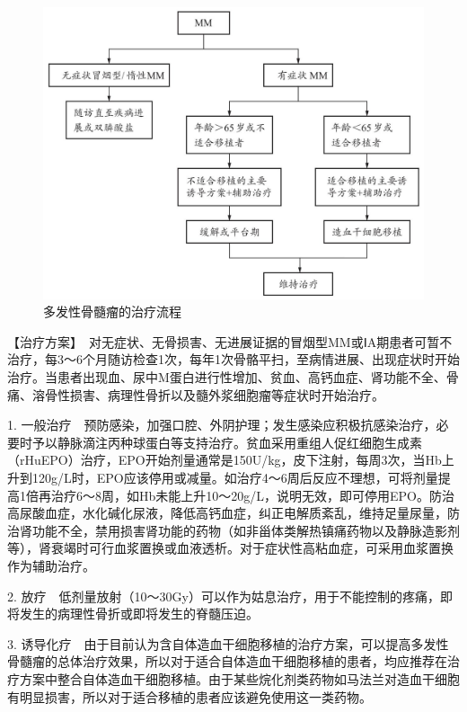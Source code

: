 \begin{figure}[!htbp]
 \centering
 \includegraphics{./images/Image00158.jpg}
 \captionsetup{justification=centering}
 \caption{多发性骨髓瘤的治疗流程}
 \label{fig5-4-4}
  \end{figure} 

【治疗方案】　对无症状、无骨损害、无进展证据的冒烟型MM或ⅠA期患者可暂不治疗，每3～6个月随访检查1次，每年1次骨骼平扫，至病情进展、出现症状时开始治疗。当患者出现血、尿中M蛋白进行性增加、贫血、高钙血症、肾功能不全、骨痛、溶骨性损害、病理性骨折以及髓外浆细胞瘤等症状时开始治疗。

1.
一般治疗　预防感染，加强口腔、外阴护理；发生感染应积极抗感染治疗，必要时予以静脉滴注丙种球蛋白等支持治疗。贫血采用重组人促红细胞生成素（rHuEPO）治疗，EPO开始剂量通常是150U/kg，皮下注射，每周3次，当Hb上升到120g/L时，EPO应该停用或减量。如治疗4～6周后反应不理想，可将剂量提高1倍再治疗6～8周，如Hb未能上升10～20g/L，说明无效，即可停用EPO。防治高尿酸血症，水化碱化尿液，降低高钙血症，纠正电解质紊乱，维持足量尿量，防治肾功能不全，禁用损害肾功能的药物（如非甾体类解热镇痛药物以及静脉造影剂等），肾衰竭时可行血浆置换或血液透析。对于症状性高粘血症，可采用血浆置换作为辅助治疗。

2.
放疗　低剂量放射（10～30Gy）可以作为姑息治疗，用于不能控制的疼痛，即将发生的病理性骨折或即将发生的脊髓压迫。

3.
诱导化疗　由于目前认为含自体造血干细胞移植的治疗方案，可以提高多发性骨髓瘤的总体治疗效果，所以对于适合自体造血干细胞移植的患者，均应推荐在治疗方案中整合自体造血干细胞移植。由于某些烷化剂类药物如马法兰对造血干细胞有明显损害，所以对于适合移植的患者应该避免使用这一类药物。

